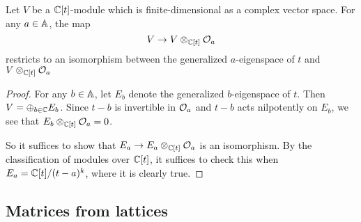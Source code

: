 \documentclass{article}
\begin{document}
\begin{lemma}\label{le:linalg} 
Let $ V $ be a $ \CC[t]$-module which is finite-dimensional as a complex vector space.  For any  $ a \in \AA$, the map
$$ 
    V  \rightarrow V \otimes_{\CC[t]} \cO_a
$$
restricts to an isomorphism between the generalized $ a $-eigenspace of $ t $ and $ V \otimes_{\CC[t]} \cO_a$
\end{lemma}
% 
\begin{proof}
    For any $ b \in \AA$, let $ E_b $ denote the generalized $b$-eigenspace of $t$.  Then $ V = \oplus_{b \in \CC} E_b$.  Since $ t - b$ is invertible in $ \cO_a$ and $ t -b $ acts nilpotently on $ E_b$, we see that $ E_b \otimes_{\CC[t]} \cO_a = 0 $.
    
    So it suffices to show that $ E_a \rightarrow E_a \otimes_{\CC[t]} \cO_a$ is an isomorphism.  By the classification of modules over $ \CC[t]$, it suffices to check this when  $ E_a = \CC[t]/(t-a)^k$, where it is clearly true.
\end{proof}
% 

\subsection{Matrices from lattices}\label{ss:mvyisos}
\end{document}
